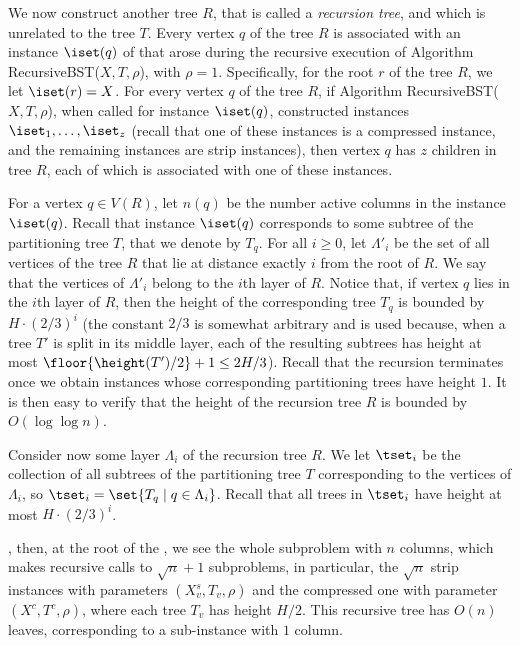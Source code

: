 \documentclass{toc}
\begin{document}
We now construct another tree $R$, that is called a \emph{recursion tree}, and which is unrelated to the tree $T$. Every vertex $q$ of the tree $R$ is associated with an instance $\iset(q)$ of \minsat that arose during the recursive execution of Algorithm {\sc RecursiveBST}($X,T,\rho$), with $\rho=1$. 
Specifically, for the root $r$ of the tree $R$, we let $\iset(r)=X$. For every vertex $q$ of the tree $R$, if Algorithm  {\sc RecursiveBST}($X,T,\rho$), when called for instance $\iset(q)$, constructed instances $\iset_1,\ldots,\iset_z$ (recall that one of these instances is a compressed instance, and the remaining instances are strip instances), then vertex $q$ has $z$ children in tree $R$, each of which is associated with one of these instances.

For a vertex $q\in V(R)$, let $n(q)$ be the number active columns in the instance $\iset(q)$. 
Recall that instance $\iset(q)$ corresponds to some subtree of the partitioning tree $T$, that we denote by $T_q$. 
For all $i\geq 0$, let $\Lambda'_i$ be the set of all vertices of the tree $R$ that lie at distance exactly $i$ from the root of $R$. We say that the vertices of $\Lambda'_i$ belong to the $i$th layer of $R$. Notice that, if vertex $q$ lies in the $i$th layer of $R$, then the height of the corresponding tree $T_q$ is bounded by $H\cdot (2/3)^i$ (the constant $2/3$ is somewhat arbitrary and is used because, when a tree $T'$ is split in its middle layer, each of the resulting subtrees has height at most $\floor{\height(T')/2}+1\leq 2H/3$).
Recall that the recursion terminates once we obtain instances whose corresponding partitioning trees have height $1$. It is then easy to verify that the height of the recursion tree $R$ is bounded by $O(\log\log n)$.

%
%
%
%


Consider now some layer $\Lambda_i$ of the recursion tree $R$. We let $\tset_i$ be the collection of all subtrees of the partitioning tree $T$ corresponding to the vertices of $\Lambda_i$, so $\tset_i=\set{T_q\mid q\in \Lambda_i}$. Recall that all trees in $\tset_i$ have height at most $H\cdot (2/3)^i$.


\iffalse
, then, at the root of the , we see the whole subproblem with $n$ columns, which makes recursive calls to $\sqrt{n}+1$ subproblems, in particular, the $\sqrt{n}$ strip instances with parameters $(X^s_v, T_v, \rho)$ and the compressed one with parameter $(X^c, T^c, \rho)$, where each tree $T_v$ has height $H/2$.
This recursive tree has $O(n)$ leaves, corresponding to a sub-instance with $1$ column. 
 
\end{document}
